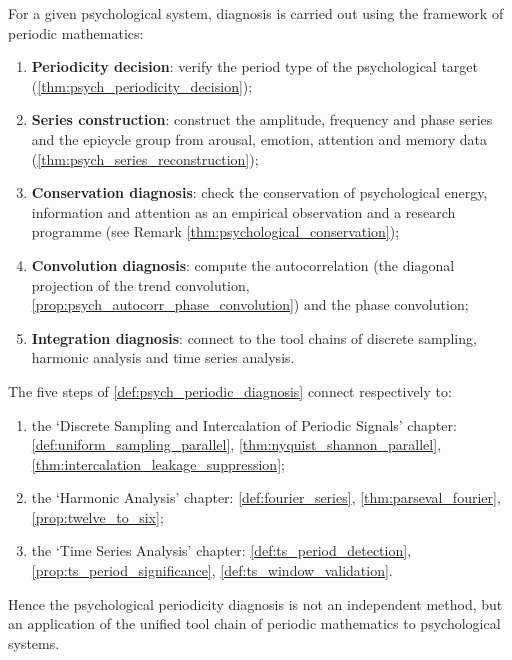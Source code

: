 \begin{definition}\label{def:psych_periodic_diagnosis}
For a given psychological system, diagnosis is carried out using the framework of periodic mathematics:
\begin{enumerate}[label=(\roman*)]
    \item \textbf{Periodicity decision}: verify the period type of the psychological target (\cref{thm:psych_periodicity_decision});
    \item \textbf{Series construction}: construct the amplitude, frequency and phase series and the epicycle group from arousal, emotion, attention and memory data (\cref{thm:psych_series_reconstruction});
    \item \textbf{Conservation diagnosis}: check the conservation of psychological energy, information and attention as an empirical observation and a research programme (see Remark \cref{thm:psychological_conservation});
    \item \textbf{Convolution diagnosis}: compute the autocorrelation (the diagonal projection of the trend convolution, \cref{prop:psych_autocorr_phase_convolution}) and the phase convolution;
    \item \textbf{Integration diagnosis}: connect to the tool chains of discrete sampling, harmonic analysis and time series analysis.
\end{enumerate}
\end{definition}

\begin{theorem}\label{thm:psych_diagnosis_integration}
The five steps of \cref{def:psych_periodic_diagnosis} connect respectively to:
\begin{enumerate}[label=(\roman*)]
    \item the `Discrete Sampling and Intercalation of Periodic Signals' chapter: \cref{def:uniform_sampling_parallel}, \cref{thm:nyquist_shannon_parallel}, \cref{thm:intercalation_leakage_suppression};
    \item the `Harmonic Analysis' chapter: \cref{def:fourier_series}, \cref{thm:parseval_fourier}, \cref{prop:twelve_to_six};
    \item the `Time Series Analysis' chapter: \cref{def:ts_period_detection}, \cref{prop:ts_period_significance}, \cref{def:ts_window_validation}.
\end{enumerate}
Hence the psychological periodicity diagnosis is not an independent method, but an application of the unified tool chain of periodic mathematics to psychological systems.
\end{theorem}

